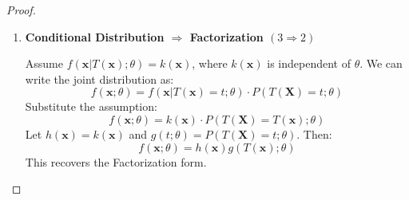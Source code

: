 \documentclass[
  letterpaper,
  DIV=11,
  numbers=noendperiod]{scrreprt}
\renewcommand{\[}{\begin{equation}}
\renewcommand{\]}{\end{equation}}
\theoremstyle{definition}
\theoremstyle{plain}
\theoremstyle{plain}
\theoremstyle{plain}
\theoremstyle{definition}
\theoremstyle{plain}
\theoremstyle{remark}
\begin{document}
\begin{proof}
\begin{enumerate}
  Assume
  \(f(\mathbf{x}; \theta) = h(\mathbf{x})g(T(\mathbf{x}); \theta)\). We
  derive the conditional distribution
  \(P(\mathbf{X}=\mathbf{x} | T(\mathbf{X})=t)\). If
  \(T(\mathbf{x}) \neq t\), the probability is 0 (independent of
  \(\theta\)). If \(T(\mathbf{x}) = t\): \[
  P(\mathbf{X}=\mathbf{x} | T(\mathbf{X})=t) = \frac{P(\mathbf{X}=\mathbf{x}, T(\mathbf{X})=t)}{P(T(\mathbf{X})=t)} = \frac{f(\mathbf{x}; \theta)}{\sum_{\{\mathbf{y} : T(\mathbf{y})=t\}} f(\mathbf{y}; \theta)}
  \] Substitute the factorization: \[
  = \frac{h(\mathbf{x})g(t; \theta)}{\sum_{\{\mathbf{y} : T(\mathbf{y})=t\}} h(\mathbf{y})g(t; \theta)} = \frac{h(\mathbf{x})g(t; \theta)}{g(t; \theta) \sum_{\{\mathbf{y} : T(\mathbf{y})=t\}} h(\mathbf{y})}
  \] The term \(g(t; \theta)\) cancels out: \[
  = \frac{h(\mathbf{x})}{\sum_{\{\mathbf{y} : T(\mathbf{y})=t\}} h(\mathbf{y})}
  \] This expression depends only on \(\mathbf{x}\) and \(h(\cdot)\),
  and is entirely free of \(\theta\). Thus, Condition 3 holds.
\item
  \textbf{Conditional Distribution \(\Rightarrow\) Factorization
  \((3 \Rightarrow 2)\)}

  Assume \(f(\mathbf{x} | T(\mathbf{x}); \theta) = k(\mathbf{x})\),
  where \(k(\mathbf{x})\) is independent of \(\theta\). We can write the
  joint distribution as: \[
  f(\mathbf{x}; \theta) = f(\mathbf{x} | T(\mathbf{x})=t; \theta) \cdot P(T(\mathbf{X})=t; \theta)
  \] Substitute the assumption: \[
  f(\mathbf{x}; \theta) = k(\mathbf{x}) \cdot P(T(\mathbf{X})=T(\mathbf{x}); \theta)
  \] Let \(h(\mathbf{x}) = k(\mathbf{x})\) and
  \(g(t; \theta) = P(T(\mathbf{X})=t; \theta)\). Then: \[
  f(\mathbf{x}; \theta) = h(\mathbf{x}) g(T(\mathbf{x}); \theta)
  \] This recovers the Factorization form.
\end{enumerate}

\end{proof}
\end{document}
